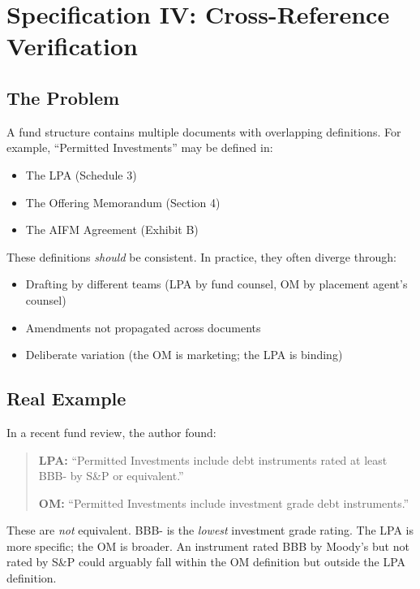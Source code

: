 
\section{Specification IV: Cross-Reference Verification}
\label{sec:crossref}

\subsection{The Problem}
\label{sec:crossref-problem}

A fund structure contains multiple documents with overlapping definitions. For example, ``Permitted Investments'' may be defined in:

\begin{itemize}
  \item The LPA (Schedule 3)
  \item The Offering Memorandum (Section 4)
  \item The AIFM Agreement (Exhibit B)
\end{itemize}

These definitions \textit{should} be consistent. In practice, they often diverge through:

\begin{itemize}
  \item Drafting by different teams (LPA by fund counsel, OM by placement agent's counsel)
  \item Amendments not propagated across documents
  \item Deliberate variation (the OM is marketing; the LPA is binding)
\end{itemize}

\subsection{Real Example}
\label{sec:crossref-example}

In a recent fund review, the author found:

\begin{quote}
\textbf{LPA:} ``Permitted Investments include debt instruments rated at least BBB- by S\&P or equivalent.''

\textbf{OM:} ``Permitted Investments include investment grade debt instruments.''
\end{quote}

These are \textit{not} equivalent. BBB- is the \textit{lowest} investment grade rating. The LPA is more specific; the OM is broader. An instrument rated BBB by Moody's but not rated by S\&P could arguably fall within the OM definition but outside the LPA definition.

